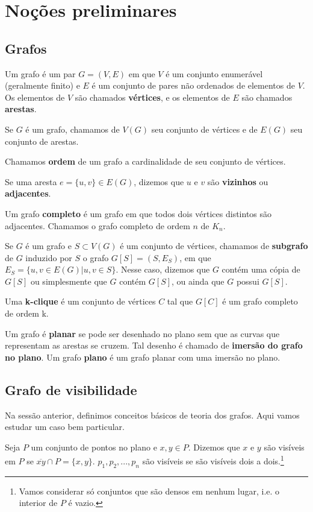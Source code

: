 \documentclass[a4paper]{book}
\begin{document}
\chapter{Noções preliminares}
\section{Grafos}
Um grafo é um par $G=(V,E)$ em que $V$ é um conjunto enumerável (geralmente finito) e $E$ é um conjunto de pares não ordenados de elementos de $V$. Os elementos de $V$ são chamados \textbf{vértices}, e os elementos de $E$ são chamados \textbf{arestas}.

Se $G$ é um grafo, chamamos de $V(G)$ seu conjunto de vértices e de $E(G)$ seu conjunto de arestas.

Chamamos \textbf{ordem} de um grafo a cardinalidade de seu conjunto de vértices.

Se uma aresta $e=\{u,v\}\in E(G)$, dizemos que $u$ e $v$ são \textbf{vizinhos} ou \textbf{adjacentes}.

Um grafo \textbf{completo} é um grafo em que todos dois vértices distintos são adjacentes. Chamamos o grafo completo de ordem $n$ de $K_n$.

Se $G$ é um grafo e  $S\subset V(G)$ é um conjunto de vértices, chamamos de \textbf{subgrafo} de $G$ induzido por $S$ o grafo $G[S]=(S,E_S)$, em que $E_S=\{{u,v}\in E(G)|u,v\in S\}$. Nesse caso, dizemos que $G$ contém uma cópia de $G[S]$ ou simplesmente que $G$ contém $G[S]$, ou ainda que $G$ possui $G[S]$.

Uma \textbf{k-clique} é um conjunto de vértices $C$ tal que $G[C]$ é um grafo completo de ordem k.

Um grafo é \textbf{planar} se pode ser desenhado no plano sem que as curvas que representam as arestas se cruzem. Tal desenho é chamado de \textbf{imersão do grafo no plano}. Um grafo \textbf{plano} é um grafo planar com uma imersão no plano.

\section{Grafo de visibilidade}
Na sessão anterior, definimos conceitos básicos de teoria dos grafos. Aqui vamos estudar um caso bem particular.

Seja $P$ um conjunto de pontos no plano e $x,y\in P$. Dizemos que $x$ e $y$ são visíveis em $P$ se $\overline{xy}\cap P =\{x,y\}$. $p_1, p_2, ..., p_n$ são visíveis se são visíveis dois a dois.\footnote{Vamos considerar só conjuntos que são densos em nenhum lugar, i.e. o interior de $P$ é vazio.}
\end{document}
